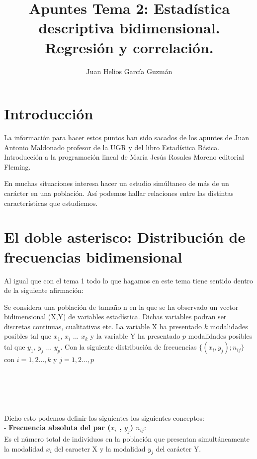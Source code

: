 \documentclass{article}
\begin{document}
	\author{Juan Helios García Guzmán}
	\large
	\title{ %
	Apuntes Tema 2: Estadística descriptiva bidimensional. Regresión y correlación. \\
	 }
	\maketitle
	

 \section{Introducción}
	La información para hacer estos puntos han sido sacados de los apuntes de Juan Antonio Maldonado profesor de la UGR y del libro Estadística Básica. Introducción a la programación lineal de María Jesús Rosales Moreno editorial Fleming. 
 
 En muchas situaciones interesa hacer un estudio simúltaneo de más de un carácter en una población. Así podemos hallar relaciones entre las distintas características que estudiemos.
 \section{El doble asterisco: Distribución de frecuencias bidimensional}
 Al igual que con el tema 1 todo lo que hagamos en este tema tiene sentido dentro de la siguiente afirmación:
 
 Se considera una población de tamaño n en la que se ha observado un vector bidimensional (X,Y) de variables estadística. Dichas variables podran ser discretas continuas, cualitativas etc. La variable X ha presentado $k$ modalidades posibles tal que $x_1$, $x_i$ ... $x_k$ y la variable Y ha presentado $p$ modalidades posibles tal que $y_1$, $y_j$ ... $y_p$. Con la siguiente distribución de frecuencias $\{(x_i , y_j); n_{ij}\}$ con $i=1,2\dots,k$ y $j=1,2\dots,p$  \\ \\ \\ \\ \\ \\
 
 Dicho esto podemos definir los siguientes los siguientes conceptos: \\  
 
  - \textbf{Frecuencia absoluta del par ($x_i$ , $y_j$) $n_{ij}$}: \\
 
  Es el número total de individuos en la población que presentan simultáneamente la modalidad $x_i$ del caracter X y la modalidad $y_j$ del carácter Y.  \\
  
\end{document}
